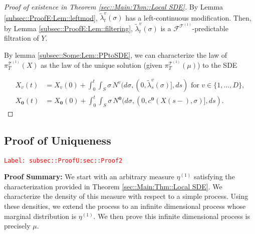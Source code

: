 \documentclass[12pt]{article}
\newcommand{\mc}{\mathcal}
\newcommand{\te}{\text}
\newcommand{\tr}{\textcolor{red}}
\newcommand{\labe}[1]{\tr{\texttt{Label: #1}}}
\newcommand{\pfsum}{\textbf{Proof Summary: }}
\newcommand{\ind}{\hspace{24pt}}
\renewcommand{\root}{\mathbf{0}}				%
\renewcommand{\v}{v}							%
\renewcommand{\S}{S}							%
\newcommand{\s}{\sigma}							%
\newcommand{\T}{T}								%
\renewcommand{\t}{t}							%
\newcommand{\proj}{\pi}							%
\renewcommand{\tt}{s}							%
\newcommand{\F}{\mc{F}}							%
\newcommand{\X}{X}								%
\newcommand{\IGr}{c}							%
\newcommand{\vind}[1]{^{#1}}					%
\newcommand{\vsi}[1]{^{#1}}						%
\newcommand{\cind}[1]{_{#1}}					%
\newcommand{\tp}[1]{(#1)}						%
\newcommand{\ts}[1]{_{#1}}						%
\newcommand{\degr}{D}							%
\newcommand{\tree}{\mc{T}}						%
\newcommand{\sln}[1]{^{(#1)}}					%
\newcommand{\poiss}{N}							%
\newcommand{\alt}[1]{\widetilde{#1}}			%
\newcommand{\m}{\mu}							%
\newcommand{\mmm}{\eta}							%
\newcommand{\XX}{Y}								%
\newcommand{\crate}{\alt{\lambda}}				%
\begin{document}
\begin{proof}[Proof of existence in Theorem \ref{sec::Main:Thm::Local SDE}]
By Lemma \ref{subsec::ProofE:Lem::leftmod}, \(\crate\vind{\v}\ts{\t}(\s)\) has a left-continuous modification. Then, by Lemma \ref{subsec::ProofE:Lem::filtering}, \(\crate\vind{\v}\ts{\t}(\s)\) is a \(\F\vsi{\tree\sln{1}}\)-predictable filtration of \(\XX\).

\ind By lemma \ref{subsec::Some:Lem::PPtoSDE}, we can characterize the law of \(\proj\vsi{\tree\sln{1}}\ts{\T}(\X)\) as the law of the unique solution (given \(\proj\vsi{\tree\sln{1}}\ts{\T}(\m)\)) to the SDE

\begin{align*}
\X\cind{\v}\tp{\t} &= \X\cind{\v}\tp{0} + \int_0^\t\int_\S \s\,\poiss\vind{\v}(d\s,(0,\crate\vind{\v}\ts{\tt}(\s)],d\tt) \te{ for } \v \in \{1,\dots,\degr\},\\
\X\cind{\root}\tp{\t} &= \X\cind{\root}\tp{0} + \int_0^\t\int_\S \s\,\poiss\vind{\root}(d\s,(0,\IGr\vind{\root}(\X\tp{\tt-},\s)],d\tt).
\end{align*}
\end{proof}

\subsection{Proof of Uniqueness}
\label{subsec::ProofU:sec::Proof2}\labe{subsec::ProofU:sec::Proof2}

\pfsum We start with an arbitrary measure \(\mmm\sln{1}\) satisfying the characterization provided in Theorem \ref{sec::Main:Thm::Local SDE}. We characterize the density of this measure with respect to a simple process. Using these densities, we extend the process to an infinite dimensional process whose marginal distribution is \(\mmm\sln{1}\). We then prove this infinite dimensional process is precisely \(\m\).
\end{document}
